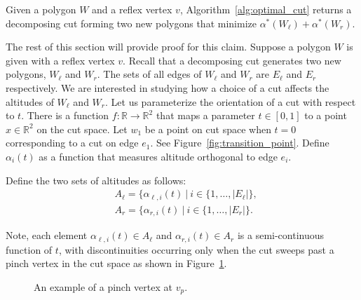 \documentclass[../main.tex]{subfiles}
\begin{document}
\begin{claim}
Given a polygon $W$ and a reflex vertex $v$, Algorithm~\ref{alg:optimal_cut} returns a decomposing cut forming two new polygons that minimize $\alpha^*(W_{\ell})+\alpha^*(W_r)$.
\end{claim}

The rest of this section will provide proof for this claim. Suppose a polygon $W$ is given with a reflex vertex $v$. Recall that a decomposing cut generates two new polygons, $W_{\ell}$ and $W_r$. The sets of all edges of $W_{\ell}$ and $W_r$ are $E_{\ell}$ and $E_r$ respectively. We are interested in studying how a choice of a cut affects the altitudes of $W_{\ell}$ and $W_r$. Let us parameterize the orientation of a cut with respect to $t$. There is a function $f:\mathbb{R}\to\mathbb{R}^2$ that maps a parameter $t\in[0,1]$ to a point $x\in\mathbb{R}^2$ on the cut space. Let $w_1$ be a point on cut space when $t=0$ corresponding to a cut on edge $e_1$. See Figure~\ref{fig:transition_point}. Define $\alpha_i(t)$ as a function that measures altitude orthogonal to edge $e_i$.

Define the two sets of altitudes as follows:
\begin{equation}
\begin{aligned}
\label{eq:set_of_altitudes}
	&A_{\ell}=\{\alpha_{\ell,i}(t)\ |\ i\in\{1,\ldots,|E_{\ell}|\},\\
	&A_{r}=\{\alpha_{r,i}(t)\ |\ i\in\{1,\ldots,|E_r|\}.
\end{aligned}
\end{equation}

Note, each element $\alpha_{\ell,i}(t)\in A_{\ell}$ and $\alpha_{r,i}(t)\in A_r$ is a semi-continuous function of $t$, with discontinuities occurring only when the cut sweeps past a pinch vertex in the cut space as shown in Figure~\ref{fig:pinch_vertex}.

\begin{figure}
	\centering
	
	\caption{An example of a pinch vertex at $v_p$.}
	\label{fig:pinch_vertex}
\end{figure}
\end{document}
